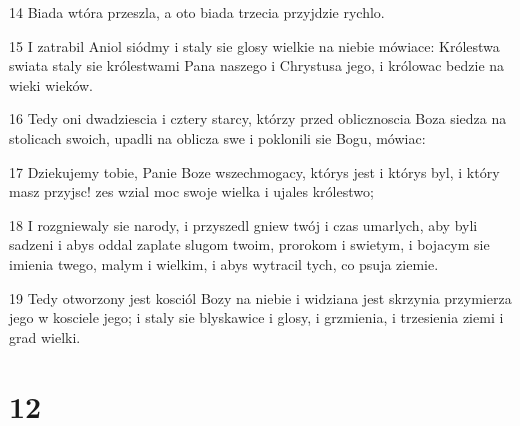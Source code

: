 \par 14 Biada wtóra przeszla, a oto biada trzecia przyjdzie rychlo.
\par 15 I zatrabil Aniol siódmy i staly sie glosy wielkie na niebie mówiace: Królestwa swiata staly sie królestwami Pana naszego i Chrystusa jego, i królowac bedzie na wieki wieków.
\par 16 Tedy oni dwadziescia i cztery starcy, którzy przed oblicznoscia Boza siedza na stolicach swoich, upadli na oblicza swe i poklonili sie Bogu, mówiac:
\par 17 Dziekujemy tobie, Panie Boze wszechmogacy, którys jest i którys byl, i który masz przyjsc! zes wzial moc swoje wielka i ujales królestwo;
\par 18 I rozgniewaly sie narody, i przyszedl gniew twój i czas umarlych, aby byli sadzeni i abys oddal zaplate slugom twoim, prorokom i swietym, i bojacym sie imienia twego, malym i wielkim, i abys wytracil tych, co psuja ziemie.
\par 19 Tedy otworzony jest kosciól Bozy na niebie i widziana jest skrzynia przymierza jego w kosciele jego; i staly sie blyskawice i glosy, i grzmienia, i trzesienia ziemi i grad wielki.

\chapter{12}

